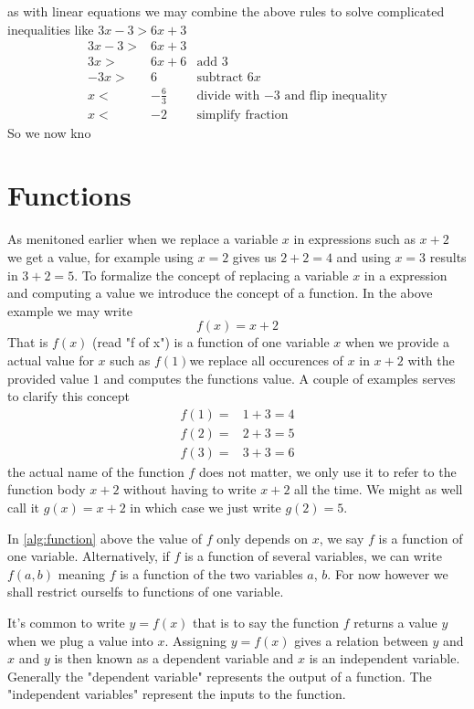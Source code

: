 as with linear equations we may combine the above rules to solve complicated inequalities like $3x -3 > 6x + 3$
\begin{align*}
3x - 3 >& 6x + 3       &                                               \\
3x     >& 6x + 6       & \textrm{add $3$}                              \\
-3x    >& 6            & \textrm{subtract $6x$}                        \\
x      <& -\frac{6}{3} & \textrm{divide with $-3$ and flip inequality} \\
x      <& -2           & \textrm{simplify fraction}
\end{align*}
So we now kno

\section{Functions}
As menitoned earlier when we replace a variable $x$ in expressions such as $x+2$ we get a value, for example using $x=2$ gives us $2+2=4$ and using $x=3$ results in $3+2=5$. To formalize the concept of replacing a variable $x$ in a expression and computing a value we introduce the concept of a function. In the above example we may write
\begin{equation}\label{alg:function}
f(x) = x + 2
\end{equation}
That is $f(x)$ (read "f of x") is a function of one variable $x$ when we provide a actual value for $x$ such as $f(1) $we replace all occurences of $x$ in $x+2$ with the provided value $1$ and computes the functions value. A couple of examples serves to clarify this concept
\begin{align*}
f(1) =& 1 + 3 = 4 \\
f(2) =& 2 + 3 = 5 \\
f(3) =& 3 + 3 = 6
\end{align*}
the actual name of the function $f$ does not matter, we only use it to refer to the function body $x+2$ without having to write $x+2$ all the time. We might as well call it $g(x) = x + 2$ in which case we just write $g(2) = 5$.

In \ref{alg:function} above the value of $f$ only depends on $x$, we say $f$ is a function of one variable. Alternatively, if $f$ is a function of several variables, we can write $f(a, b)$ meaning $f$ is a function of the two variables $a$, $b$. For now however we shall restrict ourselfs to functions of one variable.

It's common to write $y = f(x)$ that is to say the function $f$ returns a value $y$ when we plug a value into $x$. Assigning $y = f(x)$ gives a relation between $y$ and $x$ and $y$ is then known as a dependent variable and $x$ is an independent variable. Generally the "dependent variable" represents the output of a function. The "independent variables" represent the inputs to the function.

